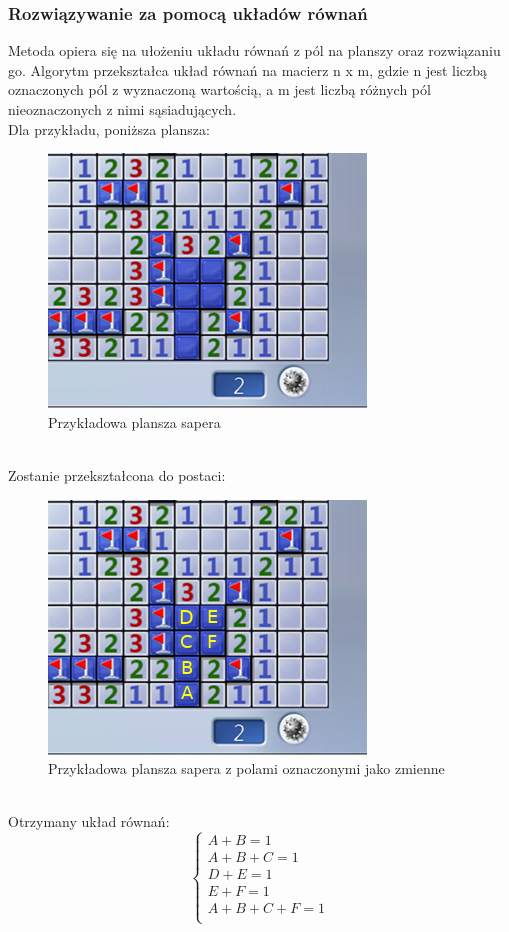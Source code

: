 \documentclass{article} %
\begin{document}
\subsubsection{Rozwiązywanie za pomocą układów równań}
Metoda opiera się na ułożeniu układu równań z pól na planszy oraz rozwiązaniu go. 
Algorytm przekształca układ równań na macierz n x m, gdzie n jest liczbą oznaczonych 
pól z wyznaczoną wartością, a m jest liczbą różnych pól nieoznaczonych z nimi sąsiadujących.\\
Dla przykładu, poniższa plansza:
\begin{figure}[h]
    \centering
    \includegraphics[scale=0.5]{matrix_first.png}
    \caption{Przykładowa plansza sapera}
\end{figure} \\
Zostanie przekształcona do postaci:\\
\begin{figure}[h]
    \centering
    \includegraphics[scale=0.5]{matrix_marked.png}
    \caption{Przykładowa plansza sapera z polami oznaczonymi jako zmienne}
\end{figure} \\
Otrzymany układ równań: \\
$$
\begin{cases}
 A + B = 1 \\
 A + B + C = 1 \\
 D + E = 1 \\
 E + F = 1 \\
 A + B + C + F = 1 \\
\end{cases}
$$
\end{document}
